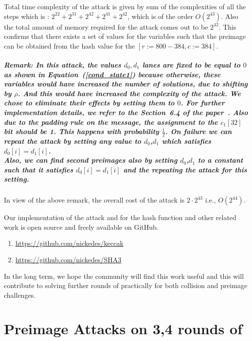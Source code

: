 Total time complexity of the attack is given by sum of the complexities of all the steps which is : $2^{22} + 2^{31} + 2^{42} + 2^{41} + 2^{42}$, which is of the order $O(2^{43})$.
Also the total amount of memory required for the attack comes out to be $2^{42}$. 
This confirms that there exists a set of values for the variables such that the preimage can be obtained from the hash value for the \KECCAK{}$[r:=800-384, c:=384]$.


\paragraph{Remark:
In this attack, the values $d_0, d_1$ lanes are fixed to be equal to $0$ as shown in Equation~(\ref{cond_state1}) because otherwise, these variables would have increased the number of solutions, due to shifting by $\rho$. 
And this would have increased the complexity of the attack. We chose to eliminate their effects by setting them to $0$. For further implementation details, we refer to the Section~6.4 of the paper~\cite{naya2011practical}. Also due to the padding rule on the message, the assignment to the $c_1[32]$ bit should be 1. This happens with probability $\tfrac{1}{2}$. On failure we can repeat the attack by setting any value to $d_0$,$d_1$ which satisfies $d_0[i]=d_1[i]$. \\
Also, we can find second preimages also by setting $d_0$,$d_1$ to a constant such that it satisfies $d_0[i]=d_1[i]$ and the repeating the attack for this setting.
}

In view of the above remark, the overall cost of the attack is $2\cdot 2^{43}$ i.e., $O(2^{44})$.

Our implementation of the attack and for the hash function and other related work is open source and freely available on GitHub.

\begin{enumerate}
    \item \url{https://github.com/nickedes/keccak}
    \item \url{https://github.com/nickedes/SHA3}
\end{enumerate}

In the long term, we hope the community will find this work useful and this will contribute to solving further rounds of \KECCAK{} practically for both collision and preimage challenges.

\chapter{Preimage Attacks on 3,4 rounds of \KECCAK{}}

